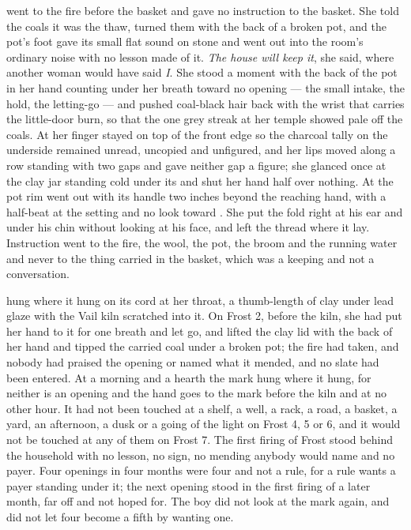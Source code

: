  went to the fire before the basket and gave no instruction to the basket. She told the coals it was the thaw, turned them with the back of a broken pot, and the pot's foot gave its small flat sound on stone and went out into the room's ordinary noise with no lesson made of it. \emph{The house will keep it}, she said, where another woman would have said \emph{I}. She stood a moment with the back of the pot in her hand counting under her breath toward no opening --- the small intake, the hold, the letting-go --- and pushed coal-black hair back with the wrist that carries the little-door burn, so that the one grey streak at her temple showed pale off the coals. At  her finger stayed on top of the front edge so the charcoal tally on the underside remained unread, uncopied and unfigured, and her lips moved along a row standing with two gaps and gave neither gap a figure; she glanced once at the clay jar standing cold under its  and shut her hand half over nothing. At  the pot rim went out with its handle two inches beyond the reaching hand, with a half-beat at the setting and no look toward . She put the fold right at his ear and under his chin without looking at his face, and left the thread where it lay. Instruction went to the fire, the wool, the pot, the broom and the running water and never to the thing carried in the basket, which was a keeping and not a conversation.

 hung where it hung on its cord at her throat, a thumb-length of clay under lead glaze with the Vail kiln scratched into it. On Frost 2, before the kiln, she had put her hand to it for one breath and let go, and lifted the clay lid with the back of her hand and tipped the carried coal under a broken pot; the fire had taken, and nobody had praised the opening or named what it mended, and no slate had been entered. At a morning and a hearth the mark hung where it hung, for neither is an opening and the hand goes to the mark before the kiln and at no other hour. It had not been touched at a shelf, a well, a rack, a road, a basket, a yard, an afternoon, a dusk or a going of the light on Frost 4, 5 or 6, and it would not be touched at any of them on Frost 7. The first firing of Frost stood behind the household with no lesson, no sign, no mending anybody would name and no payer. Four openings in four months were four and not a rule, for a rule wants a payer standing under it; the next opening stood in the first firing of a later month, far off and not hoped for. The boy did not look at the mark again, and did not let four become a fifth by wanting one.


